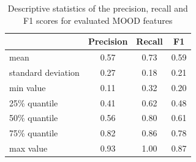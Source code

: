     \begin{table}[t]
        \centering
        \begin{tabular}{lccc}
            \toprule
            {} & {Precision} & {Recall} & {F1} \\ %
            \midrule
            mean & 0.57 & 0.73 & 0.59 \\ 
            standard deviation & 0.27 & 0.18 & 0.21 \\ 
            min value & 0.11 & 0.32 & 0.20 \\ %
            25\% quantile & 0.41 & 0.62 & 0.48 \\ %
            50\% quantile & 0.56 & 0.80 & 0.61 \\ %
            75\% quantile & 0.82 & 0.86 & 0.78 \\ %
            max value & 0.93 & 1.00 & 0.87 \\ %
            \bottomrule
        \end{tabular}
        \caption{Descriptive statistics of the precision, recall and F1 scores for evaluated MOOD features}
        \label{tab:mood-accuracy}
    \end{table}

